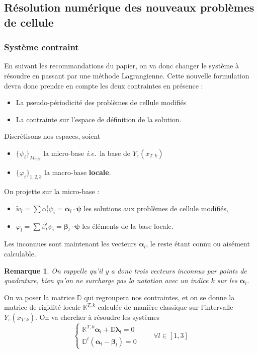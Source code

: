 \documentclass[11pt]{article}
\newtheorem{rmq}{Remarque}
\newcommand{\D}{\mathbb{D}}
\newcommand{\Ktk}{\mathbb{K}^{T,k}}
\newcommand{\Ye}{Y_\varepsilon}
\newcommand{\tw}{\tilde{w}}
\newcommand{\ie}{\emph{i.e.{}}~}
\newcommand{\balpha}{\bm{\alpha}}
\newcommand{\bbeta}{\bm{\beta}}
\newcommand{\blambda}{\bm{\lambda}}
\newcommand{\bpsi}{\bm{\psi}}
\newcommand{\xtk}{x_{T,k}}
\begin{document}
\subsection{Résolution numérique des nouveaux problèmes de cellule}

\subsubsection{Système contraint}


En suivant les recommandations du papier, on va donc changer le système à résoudre en passant par une méthode Lagrangienne. Cette nouvelle formulation
devra donc prendre en compte les deux contraintes en présence :
\begin{itemize}
\item La pseudo-périodicité des problèmes de cellule modifiés
\item La contrainte sur l'espace de définition de la solution.
\end{itemize}
Discrétisons nos espaces,  soient
\begin{itemize}
\item $\{\psi_i\}_{M_{mic}}$ la micro-base \ie la base de $\Ye(\xtk)$ 
\item  $\{\varphi_i\}_{1,2,3}$ la macro-base \textbf{locale}.
\end{itemize}
On projette sur la micro-base :
\begin{itemize}
\item $\tw_l = \sum \alpha^i_l \psi_i = \balpha_l \cdot \bpsi$ \quad les solutions aux problèmes de cellule modifiés,
\item $\varphi_l = \sum \beta^i_l \psi_i = \bbeta_l \cdot \bpsi$ \quad les éléments de la base locale.
\end{itemize}
Les inconnues sont maintenant les vecteurs $\balpha_l$, le reste étant connu ou aisément calculable.
\begin{rmq}
  On rappelle qu'il y a donc trois vecteurs inconnus par points de quadrature, bien qu'on ne surcharge pas la notation avec un indice $k$ sur les
  $\balpha_l$.
\end{rmq}
On va poser la matrice $\D$ qui
regroupera nos contraintes, et on se donne la matrice de rigidité locale $\Ktk$ calculée de manière classique sur l'intervalle $\Ye(\xtk)$. On va
chercher à résoudre les systèmes
\begin{equation}
  \label{eq:sysconst}
  \begin{cases}
    \Ktk \balpha_l + \D \blambda_l = 0 \\
    \D^t(\balpha_l - \bbeta_l) = 0 
  \end{cases} \qquad \forall l \in [1, 3]
\end{equation}
\end{document}
